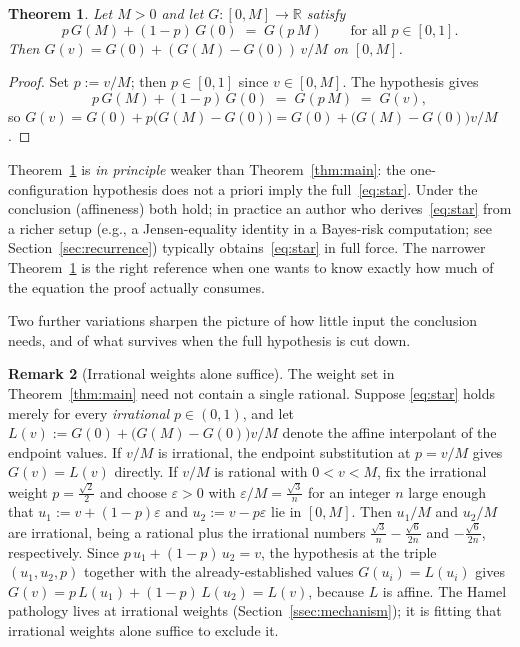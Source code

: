 \documentclass{article}
\theoremstyle{plain}
\newtheorem{theorem}{Theorem}
\theoremstyle{definition}
\newtheorem{remark}[theorem]{Remark}
\newcommand{\R}{\mathbb{R}}
\begin{document}
\begin{theorem}\label{thm:weak}
Let $M>0$ and let $G\colon[0,M]\to\R$ satisfy
\[
p\,G(M)+(1-p)\,G(0) \;=\; G(p\,M) \qquad \text{for all }p\in[0,1].
\]
Then $G(v)=G(0)+(G(M)-G(0))\,v/M$ on $[0,M]$.
\end{theorem}

\begin{proof}
Set $p:=v/M$; then $p\in[0,1]$ since $v\in[0,M]$. The hypothesis gives
\[
p\,G(M)+(1-p)\,G(0) \;=\; G(p\,M) \;=\; G(v),
\]
so $G(v)=G(0)+p\bigl(G(M)-G(0)\bigr)=G(0)+\bigl(G(M)-G(0)\bigr)v/M$.
\end{proof}

Theorem~\ref{thm:weak} is \emph{in principle} weaker than
Theorem~\ref{thm:main}: the one-configuration hypothesis does not a priori imply
the full~\eqref{eq:star}. Under the conclusion (affineness) both hold;
in practice an author who derives~\eqref{eq:star} from a richer setup
(e.g., a Jensen-equality identity in a Bayes-risk computation;
see Section~\ref{sec:recurrence}) typically obtains~\eqref{eq:star} in
full force. The narrower Theorem~\ref{thm:weak} is the right reference
when one wants to know exactly how much of the equation the proof
actually consumes.

Two further variations sharpen the picture of how little input the
conclusion needs, and of what survives when the full hypothesis is cut
down.

\begin{remark}[Irrational weights alone suffice]\label{rem:irrational}
The weight set in Theorem~\ref{thm:main} need not contain a single
rational. Suppose \eqref{eq:star} holds merely for every
\emph{irrational} $p\in(0,1)$, and let
$L(v):=G(0)+\bigl(G(M)-G(0)\bigr)v/M$ denote the affine interpolant of
the endpoint values. If $v/M$ is irrational, the endpoint substitution
at $p=v/M$ gives $G(v)=L(v)$ directly. If $v/M$ is rational with
$0<v<M$, fix the irrational weight $p=\tfrac{\sqrt2}{2}$ and choose
$\varepsilon>0$ with $\varepsilon/M=\tfrac{\sqrt3}{n}$ for an integer
$n$ large enough that $u_1:=v+(1-p)\varepsilon$ and
$u_2:=v-p\varepsilon$ lie in $[0,M]$. Then $u_1/M$ and $u_2/M$ are
irrational, being a rational plus the irrational numbers
$\tfrac{\sqrt3}{n}-\tfrac{\sqrt6}{2n}$ and $-\tfrac{\sqrt6}{2n}$,
respectively. Since $p\,u_1+(1-p)\,u_2=v$, the hypothesis at the
triple $(u_1,u_2,p)$ together with the already-established values
$G(u_i)=L(u_i)$ gives $G(v)=p\,L(u_1)+(1-p)\,L(u_2)=L(v)$, because $L$
is affine. The Hamel pathology lives at irrational weights
(Section~\ref{ssec:mechanism}); it is fitting that irrational weights
alone suffice to exclude it.
\end{remark}
\end{document}
